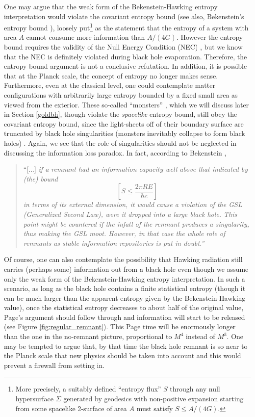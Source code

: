 \documentclass[12pt]{article}
\newcommand{\2}{$^2$}
\newcommand{\3}{$^3$}
\newcommand{\4}{$_4$}
\newcommand{\5}{$_5$}
\begin{document}
One may argue that the weak form of the Bekenstein-Hawking entropy interpretation would violate the covariant entropy bound \cite{Bousso:1999xy} (see also, Bekenstein's entropy bound \cite{287, 9307035}), loosely put\footnote{More precisely, a suitably defined ``entropy flux'' $S$ through any null hypersurface $\Sigma$ generated by geodesics with non-positive expansion starting from some spacelike 2-surface of area $A$ must satisfy $S\leqslant A/(4G)$.} as the statement that the entropy of a system with area $A$ cannot consume more information than $A/(4G)$. However the entropy bound requires the validity of the Null Energy Condition (NEC) \cite{FMW}, but we know that the NEC is definitely violated during black hole evaporation. Therefore, the entropy bound argument is not a conclusive refutation. In addition, it is possible that at the Planck scale, the concept of entropy no longer makes sense. 
Furthermore, even at the classical level, one could contemplate matter configurations with arbitrarily large entropy bounded by a fixed small area as viewed from the exterior. These so-called ``monsters'' \cite{hsu1,hsu2}, which we will discuss later in Section \ref{goldbh}, though violate the \emph{spacelike} entropy bound, still obey the covariant entropy bound, 
since the light-sheets off of their boundary surface are truncated by black hole singularities (monsters inevitably collapse to form black holes) \cite{hsu2, bousso}. Again, we see that the role of singularities should not be neglected in discussing the information loss paradox. In fact, according to Bekenstein \cite{9307035}, 
\begin{quote}
``[...]\emph{ if a remnant had an information capacity well above that indicated by (the) bound 
\begin{equation} \left[S \leqslant \frac{ 2\pi R E}{\hbar c}\right] \nonumber  \end{equation}
 in terms of its external
dimension, it would cause a violation of the GSL (Generalized Second Law), were it dropped into a large black hole. This point might be
countered if the infall of the remnant produces a singularity, thus making the GSL moot. However, in that case
the whole role of remnants as stable information repositories is put in doubt.''}
\end{quote}

Of course, one can also contemplate the possibility that Hawking radiation still carries (perhaps some) information out from a black hole even though we assume only the weak form of the Bekenstein-Hawking entropy interpretation. In such a scenario, as long as the black hole contains a finite statistical entropy (though it can be much larger than the apparent entropy given by the Bekenstein-Hawking value), once the statistical entropy decreases to about half of the original value, Page's argument should follow through and information will start to be released (see Figure \ref{fig:regular_remnant}). This Page time will be enormously longer than the one in the no-remnant picture, proportional to $M^4$ instead of $M^3$. One may be tempted to argue that, by that time the black hole remnant is so near to the Planck scale that new physics should be taken into account and this would prevent a firewall from setting in. 
\end{document}
